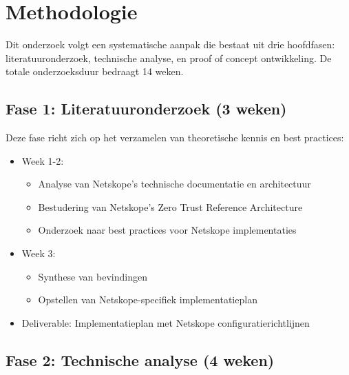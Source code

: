 


\section{Methodologie}%
\label{sec:methodologie}

Dit onderzoek volgt een systematische aanpak die bestaat uit drie hoofdfasen: literatuuronderzoek, technische analyse, en proof of concept ontwikkeling. De totale onderzoeksduur bedraagt 14 weken.

\subsection{Fase 1: Literatuuronderzoek (3 weken)}
Deze fase richt zich op het verzamelen van theoretische kennis en best practices:
\begin{itemize}
  \item Week 1-2: 
  \begin{itemize}
    \item Analyse van Netskope's technische documentatie en architectuur
    \item Bestudering van Netskope's Zero Trust Reference Architecture
    \item Onderzoek naar best practices voor Netskope implementaties
  \end{itemize}
  \item Week 3: 
  \begin{itemize}
    \item Synthese van bevindingen
    \item Opstellen van Netskope-specifiek implementatieplan
  \end{itemize}
  \item Deliverable: Implementatieplan met Netskope configuratierichtlijnen
\end{itemize}

\subsection{Fase 2: Technische analyse (4 weken)}

